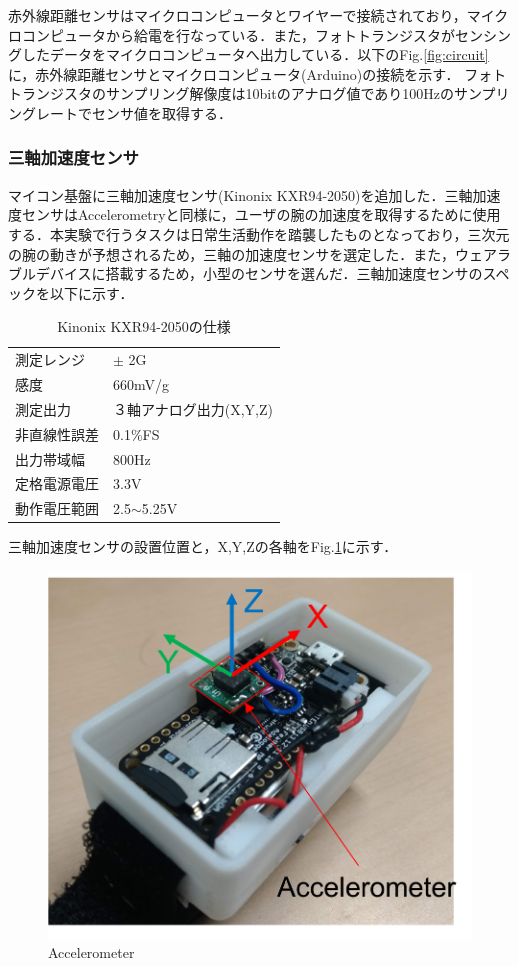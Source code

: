 赤外線距離センサはマイクロコンピュータとワイヤーで接続されており，マイクロコンピュータから給電を行なっている．また，フォトトランジスタがセンシングしたデータをマイクロコンピュータへ出力している．以下のFig.\ref{fig:circuit}に，赤外線距離センサとマイクロコンピュータ(Arduino)の接続を示す．
フォトトランジスタのサンプリング解像度は10bitのアナログ値であり100Hzのサンプリングレートでセンサ値を取得する．

\subsubsection*{三軸加速度センサ}
マイコン基盤に三軸加速度センサ(Kinonix KXR94-2050)を追加した．三軸加速度センサはAccelerometryと同様に，ユーザの腕の加速度を取得するために使用する．本実験で行うタスクは日常生活動作を踏襲したものとなっており，三次元の腕の動きが予想されるため，三軸の加速度センサを選定した．また，ウェアラブルデバイスに搭載するため，小型のセンサを選んだ．三軸加速度センサのスペックを以下に示す．

\begin{table}[H]
  \caption{Kinonix KXR94-2050の仕様}
  \centering
  \begin{tabular}{ll} 
    \hline \hline
測定レンジ&$\pm$ 2G\\
感度&660mV/g\\
測定出力&３軸アナログ出力(X,Y,Z)\\
非直線性誤差&0.1\%FS\\
出力帯域幅&800Hz\\
定格電源電圧&3.3V\\
動作電圧範囲&2.5$\sim$5.25V\\
    \hline
  \end{tabular}
\end{table}

三軸加速度センサの設置位置と，X,Y,Zの各軸をFig.\ref{fig:accelerometer}に示す．

\begin{figure}[H]
  \centering
  \includegraphics[width=0.5\linewidth]{fig/accelerometer_1}
  \caption{Accelerometer}
  \label{fig:accelerometer}
\end{figure}

